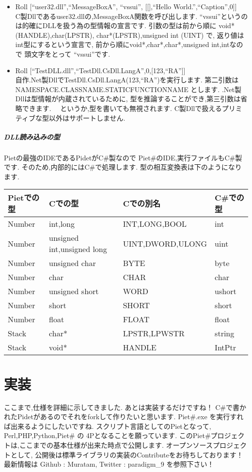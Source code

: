 \begin{itemize}
\item
  Roll {[}``user32.dll'',``MessageBoxA'', ``vssui'', {[}{[}{]},``Hello
  World.'',``Caption'',0{]}{]}\\C製Dllであるuser32.dllの,MessageBoxA関数を呼び出します.
  ``vssui''というのは的確にDLLを扱う為の型情報の宣言です.
  引数の型は前から順に void*(HANDLE),char(LPSTR),
  char*(LPSTR),unsigned int (UINT) で,
  返り値はint型にするという宣言で,
  前から順にvoid*,char*,char*,unsigned int,intなので 頭文字をとって
  ``vssui''です.
\item
  Roll
  {[}``TestDLL.dll'',``TestDll.CsDll.LangA'',0,{[}123,``RA''{]}{]}\\自作.Net製DllでTestDll.CsDll.LangA(123,``RA'')を実行します.
  第二引数は NAMESPACE.CLASSNAME.STATICFUNCTIONNAME とします.
  .Net製Dllは型情報が内蔵されているために,
  型を推論することができ,第三引数は省略できます.
  　というか,型を書いても無視されます.
  C製Dllで扱えるプリミティブな型以外はサポートしません.
\end{itemize}

\subparagraph{DLL読み込みの型}

Pietの最強のIDEであるPidetがC\#製なので
Piet\#のIDE,実行ファイルもC\#製です. そのため,内部的にはC\#で処理します.
型の相互変換表は下のようになります.

\begin{table}[htb]
    \begin{tabular}{llll}
      Pietでの型 & Cでの型 & Cでの別名 & C\#での型 \\ \hline \hline
      Number & int,long & INT,LONG,BOOL & int \\
      Number & unsigned int,unsigned long & UINT,DWORD,ULONG & uint \\
      Number & unsigned char & BYTE & byte \\
      Number & char & CHAR &char \\
      Number & unsigned short & WORD &ushort \\
      Number & short & SHORT & short \\
      Number & float & FLOAT & float \\
      Stack & char* & LPSTR,LPWSTR & string \\
      Stack & void* & HANDLE & IntPtr
    \end{tabular}
\end{table}

\section{実装}

ここまで,仕様を詳細に示してきました. あとは実装するだけですね！
C\#で書かれたPidetがあるのでそれをforkして作りたいと思います. Piet\#.exe
を実行すれば出来るようにしたいですね.
スクリプト言語としてのPietとなって, Perl,PHP,Python,Piet\# の
4Pとなることを願っています.
このPiet\#プロジェクトは,ここまでの基本仕様が出来た時点で公開します.
オープンソースプロジェクトとして,
公開後は標準ライブラリの実装のContributeをお待ちしております！ 最新情報は
Github : Muratam, Twitter : paradigm\_9 を参照下さい！
